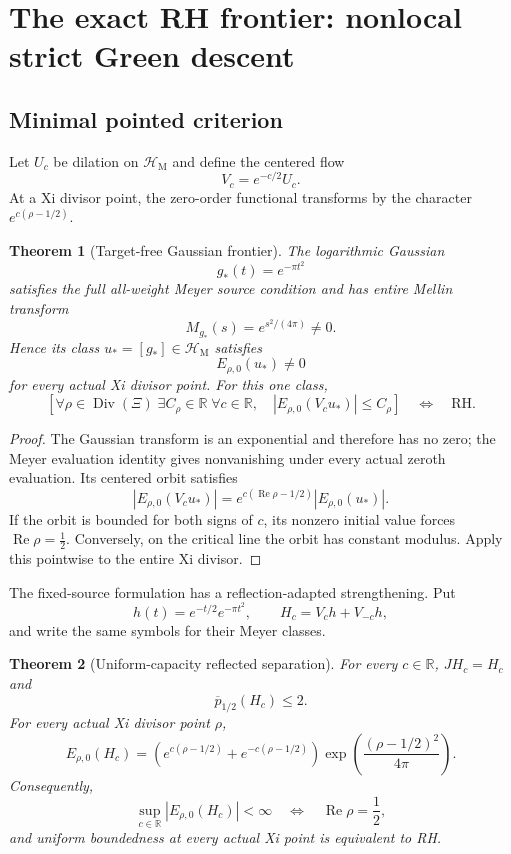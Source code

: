 \documentclass[11pt]{article}
\newtheorem{theorem}{Theorem}[section]
\theoremstyle{definition}
\theoremstyle{remark}
\newcommand{\R}{\mathbb R}
\newcommand{\cH}{\mathcal H}
\newcommand{\Rea}{\operatorname{Re}}
\newcommand{\Div}{\operatorname{Div}}
\begin{document}
\section{The exact RH frontier: nonlocal strict Green descent}
\label{sec:frontier}

\subsection{Minimal pointed criterion}

Let \(U_c\) be dilation on \(\cH_{\mathrm M}\) and define the centered
flow
\[
                         V_c=e^{-c/2}U_c.
\tag{7.1}\label{eq:centered-flow}
\]
At a Xi divisor point, the zero-order functional transforms by the
character \(e^{c(\rho-1/2)}\).

\begin{theorem}[Target-free Gaussian frontier]
\label{thm:fixed-source}
The logarithmic Gaussian
\[
                 g_\ast(t)=e^{-\pi t^2}
\]
satisfies the full all-weight Meyer source condition and has entire Mellin
transform
\[
                 M_{g_\ast}(s)=e^{s^2/(4\pi)}\ne0.
\]
Hence its class \(u_\ast=[g_\ast]\in\cH_{\mathrm M}\) satisfies
\[
                         E_{\rho,0}(u_\ast)\ne0
\]
for every actual Xi divisor point.  For this one class,
\[
\left[
 \forall\rho\in\Div(\Xi)\;\exists C_\rho\in\R\;
 \forall c\in\R,\quad |E_{\rho,0}(V_cu_\ast)|\le C_\rho
\right]
\quad\Longleftrightarrow\quad\mathrm{RH}.
\tag{7.2}\label{eq:fixed-source-rh}
\]
\end{theorem}

\begin{proof}
The Gaussian transform is an exponential and therefore has no zero; the
Meyer evaluation identity gives nonvanishing under every actual zeroth
evaluation.  Its centered orbit satisfies
\[
 |E_{\rho,0}(V_cu_\ast)|
 =e^{c(\Rea\rho-1/2)}|E_{\rho,0}(u_\ast)|.
\]
If the orbit is bounded for both signs of \(c\), its nonzero initial value
forces \(\Rea\rho=\tfrac12\).  Conversely, on the critical line the orbit
has constant modulus.  Apply this pointwise to the entire Xi divisor.
\end{proof}

The fixed-source formulation has a reflection-adapted strengthening.  Put
\[
 h(t)=e^{-t/2}e^{-\pi t^2},\qquad H_c=V_ch+V_{-c}h,
\tag{7.3}\label{eq:reflected-countertransport}
\]
and write the same symbols for their Meyer classes.

\begin{theorem}[Uniform-capacity reflected separation]
\label{thm:reflected-capacity}
For every \(c\in\R\), \(JH_c=H_c\) and
\[
                         \overline p_{1/2}(H_c)\le2.
\tag{7.4}\label{eq:uniform-capacity}
\]
For every actual Xi divisor point \(\rho\),
\[
 E_{\rho,0}(H_c)=
 \left(e^{c(\rho-1/2)}+e^{-c(\rho-1/2)}\right)
 \exp\!\left(\frac{(\rho-1/2)^2}{4\pi}\right).
\tag{7.5}\label{eq:reflected-evaluation}
\]
Consequently,
\[
 \sup_{c\in\R}|E_{\rho,0}(H_c)|<\infty
 \quad\Longleftrightarrow\quad
 \Rea\rho=\frac12,
\tag{7.6}\label{eq:reflected-selector}
\]
and uniform boundedness at every actual Xi point is equivalent to RH.
\end{theorem}
\end{document}
